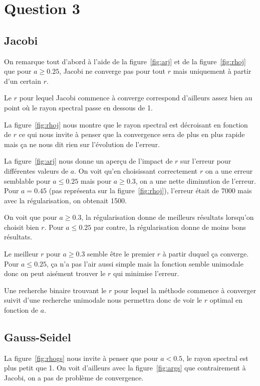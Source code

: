\section{Question 3}

\subsection{Jacobi}
On remarque tout d'abord à l'aide de la figure~\ref{fig:arj}
et de la figure~\ref{fig:rhoj} que pour $a \geq 0.25$,
Jacobi ne converge pas pour tout $r$ mais uniquement à partir
d'un certain $r$.

Le $r$ pour lequel Jacobi commence à converge correspond d'ailleurs
assez bien au point où le rayon spectral passe en dessous de 1.

La figure~\ref{fig:rhoj} nous montre que le rayon spectral est
décroisant en fonction de $r$ ce qui nous invite à penser que
la convergence sera de plus en plus rapide mais ça ne nous
dit rien sur l'évolution de l'erreur.

La figure~\ref{fig:arj} nous donne un aperçu de l'impact de $r$
sur l'erreur pour différentes valeurs de $a$.
On voit qu'en choisissant correctement $r$ on a une erreur semblable
pour $a \leq 0.25$ mais pour $a \geq 0.3$, on a une nette
diminution de l'erreur.
Pour $a = 0.45$ (pas représenta sur la figure~\ref{fig:rhoj}),
l'erreur était de 7000 mais avec la régularisation, on obtenait
1500.

On voit que pour $a \geq 0.3$, la régularisation donne de meilleurs résultats
lorsqu'on choisit bien $r$.
Pour $a \leq 0.25$ par contre, la régularisation donne de moins bons résultats.

Le meilleur $r$ pour $a \geq 0.3$ semble être le premier $r$ à partir duquel
ça converge.
Pour $a \leq 0.25$, ça n'a pas l'air aussi simple mais la fonction semble
unimodale donc on peut aisément trouver le $r$ qui minimise l'erreur.

Une recherche binaire trouvant le $r$ pour lequel la méthode commence à converger
suivit d'une recherche unimodale nous permettra donc de voir le $r$ optimal en
fonction de $a$.

\subsection{Gauss-Seidel}
La figure~\ref{fig:rhogs} nous invite à penser que pour
$a < 0.5$, le rayon spectral est plus petit que 1.
On voit d'ailleurs avec la figure~\ref{fig:args} que contrairement
à Jacobi, on a pas de problème de convergence.

